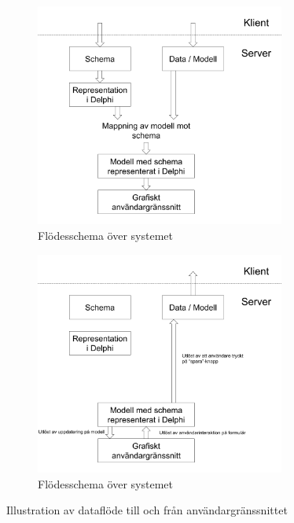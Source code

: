 \begin{figure}
	\begin{subfigure}{0.5\textwidth}
		\includegraphics[width=0.9\textwidth,left]{./images/system-ner.png}
		\caption{Flödesschema över systemet}
		\label{fig:system:ner}
	\end{subfigure}
	\begin{subfigure}{0.5\textwidth}
		\includegraphics[width=0.9\textwidth,right]{./images/system-upp.png}
		\caption{Flödesschema över systemet}
		\label{fig:system:upp}	
	\end{subfigure}
	\caption{Illustration av dataflöde till och från användargränssnittet}
	\label{fig:system}
\end{figure}

